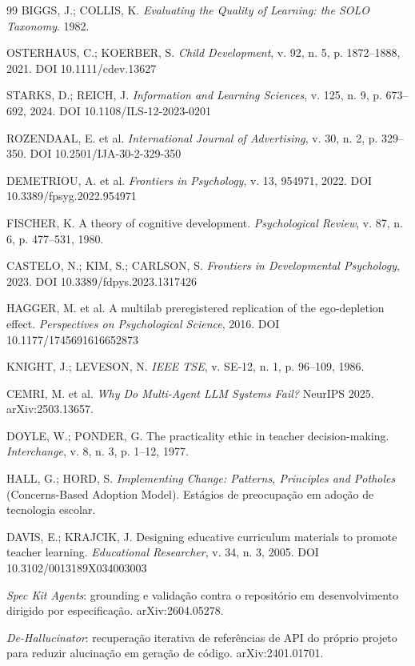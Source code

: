 \documentclass[11pt,a4paper]{article}
\begin{document}
\begin{thebibliography}{99}
BIGGS, J.; COLLIS, K. \textit{Evaluating the Quality of Learning: the SOLO Taxonomy}. 1982.

OSTERHAUS, C.; KOERBER, S. \textit{Child Development}, v. 92, n. 5, p. 1872--1888, 2021.
DOI 10.1111/cdev.13627

STARKS, D.; REICH, J. \textit{Information and Learning Sciences}, v. 125, n. 9, p. 673--692, 2024.
DOI 10.1108/ILS-12-2023-0201

ROZENDAAL, E. et al. \textit{International Journal of Advertising}, v. 30, n. 2, p. 329--350.
DOI 10.2501/IJA-30-2-329-350

DEMETRIOU, A. et al. \textit{Frontiers in Psychology}, v. 13, 954971, 2022.
DOI 10.3389/fpsyg.2022.954971

FISCHER, K. A theory of cognitive development. \textit{Psychological Review}, v. 87, n. 6,
p. 477--531, 1980.

CASTELO, N.; KIM, S.; CARLSON, S. \textit{Frontiers in Developmental Psychology}, 2023.
DOI 10.3389/fdpys.2023.1317426

HAGGER, M. et al. A multilab preregistered replication of the ego-depletion effect.
\textit{Perspectives on Psychological Science}, 2016. DOI 10.1177/1745691616652873

KNIGHT, J.; LEVESON, N. \textit{IEEE TSE}, v. SE-12, n. 1, p. 96--109, 1986.

CEMRI, M. et al. \textit{Why Do Multi-Agent LLM Systems Fail?} NeurIPS 2025. arXiv:2503.13657.

DOYLE, W.; PONDER, G. The practicality ethic in teacher decision-making. \textit{Interchange},
v. 8, n. 3, p. 1--12, 1977.

HALL, G.; HORD, S. \textit{Implementing Change: Patterns, Principles and Potholes} (Concerns-Based
Adoption Model). Estágios de preocupação em adoção de tecnologia escolar.

DAVIS, E.; KRAJCIK, J. Designing educative curriculum materials to promote teacher learning.
\textit{Educational Researcher}, v. 34, n. 3, 2005. DOI 10.3102/0013189X034003003

\textit{Spec Kit Agents}: grounding e validação contra o repositório em desenvolvimento dirigido por
especificação. arXiv:2604.05278.

\textit{De-Hallucinator}: recuperação iterativa de referências de API do próprio projeto para reduzir
alucinação em geração de código. arXiv:2401.01701.

\end{thebibliography}
\end{document}
